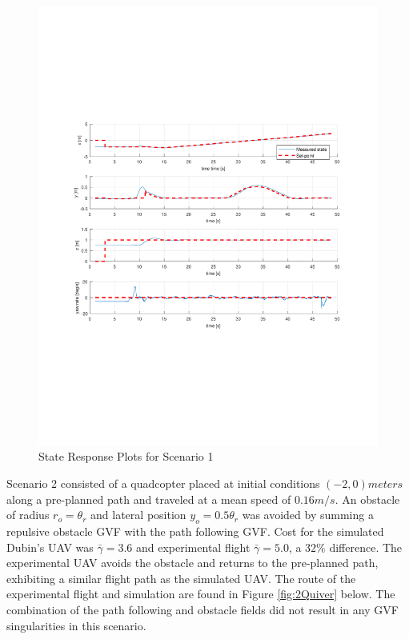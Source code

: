 \documentclass[numbered,pdftex]{ohio-etd}
\begin{document}
\begin{figure}[H]
	\centering
	\includegraphics[trim = 65 200 0 200, clip, width=17cm]{Figures/results/compareFigures/1Controller}
	\caption{State Response Plots for Scenario 1}
	\label{fig:1Controller}
\end{figure}



Scenario 2 consisted of a quadcopter placed at initial conditions $(-2,0) meters$ along a pre-planned path and traveled at a mean speed of $0.16 m/s$. An obstacle of radius $r_o = \theta_r$ and lateral position $y_o=0.5 \theta_r$ was avoided by summing a repulsive obstacle GVF with the path following GVF. Cost for the simulated Dubin's UAV was $\bar{\gamma} = 3.6$ and experimental flight $\bar{\gamma} = 5.0$, a $32 \%$ difference. The experimental UAV avoids the obstacle and returns to the pre-planned path, exhibiting a similar flight path as the simulated UAV. The route of the experimental flight and simulation are found in Figure \ref{fig:2Quiver} below. The combination of the path following and obstacle fields did not result in any GVF singularities in this scenario. 
\end{document}
